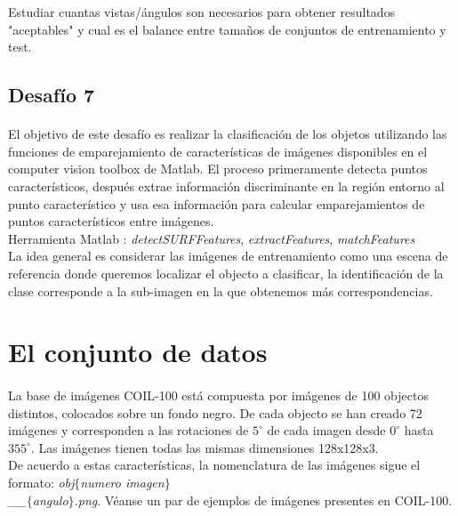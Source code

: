 \documentclass[es,gi]{ifirak}\usepackage[]{graphicx}\usepackage[]{color}
\begin{document}
Estudiar cuantas vistas/ángulos son necesarios para obtener resultados "aceptables" y cual es el balance entre tamaños de conjuntos de entrenamiento y test.\\

\subsection{Desafío 7}
\paragraph{}El objetivo de este desafío es realizar la clasificación de los objetos utilizando las funciones de emparejamiento de características de imágenes disponibles en el computer vision toolbox de Matlab. El proceso primeramente detecta puntos característicos, después extrae información discriminante en la región entorno al punto característico y usa esa información para calcular emparejamientos de puntos característicos entre imágenes.\\

Herramienta Matlab : \textit{detectSURFFeatures}, \textit{extractFeatures}, \textit{matchFeatures}\\


La idea general es considerar las imágenes de entrenamiento como una escena  de referencia donde queremos localizar el objecto a clasificar, la identificación de la clase corresponde a la sub-imagen en la que obtenemos más correspondencias.

\pagebreak
\section{El conjunto de datos}

\paragraph{} La base de imágenes COIL-100 está compuesta por imágenes de 100 objectos distintos, colocados sobre un fondo negro. De cada objecto se han creado 72 imágenes y corresponden a las rotaciones de $5^{\circ}$ de cada imagen desde $0^{\circ}$ hasta $355^{\circ}$. Las imágenes tienen todas las mismas dimensiones 128x128x3.\\

De acuerdo a estas características, la nomenclatura de las imágenes sigue el formato:  \textit{obj$\lbrace$numero imagen$\rbrace$\\ \_\_$\lbrace$angulo$\rbrace$.png}. Véanse un par de ejemplos de imágenes presentes en COIL-100.\\
\end{document}
